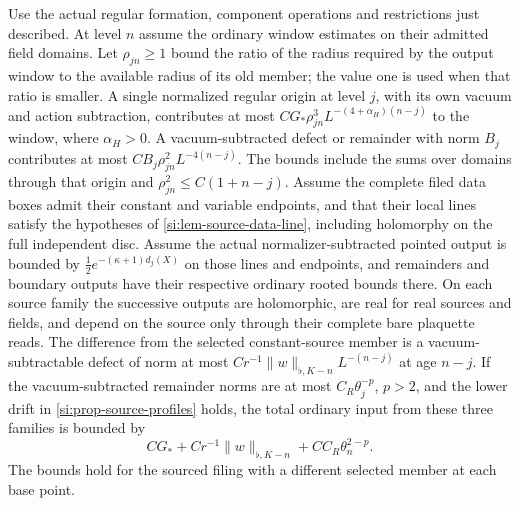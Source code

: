 \documentclass[11pt,letterpaper,reqno]{amsart}
\makeatletter
\numberwithin{equation}{section}
\theoremstyle{definition}
\newcommand{\ms@minorstart}{%
  \pushQED{\qed}\renewcommand{\qedsymbol}{$\blacksquare$}}
\newenvironment{proposition}[1][]{\ms@minorstart\ms@proposition[#1]}
  {\popQED\endms@proposition}
\theoremstyle{remark}
\makeatother
\begin{document}
\begin{samepage}
\begin{proposition}[Formation and old-origin summation]
\label{si:prop-member-formation}
Use the actual regular formation, component operations and
restrictions just described. At level $n$ assume the ordinary
window estimates on their admitted field domains. Let
$\rho_{jn}\ge1$ bound the ratio of the radius required by the
output window to the available radius of its old member;
the value one is used when that ratio is smaller. A single
normalized regular origin at level $j$, with its own vacuum and
action subtraction, contributes at most
$C G_*\rho_{jn}^3 L^{-(4+\alpha_H)(n-j)}$ to the window, where
$\alpha_H>0$. A vacuum-subtracted defect or remainder with norm
$B_j$ contributes at most $C B_j\rho_{jn}^2L^{-4(n-j)}$.
The bounds include the sums over domains through that origin and
$\rho_{jn}^2\le C(1+n-j)$. Assume the complete filed data boxes
admit their constant and variable endpoints, and that their local
lines satisfy the hypotheses of \cref{si:lem-source-data-line},
including holomorphy on the full independent disc. Assume the
actual normalizer-subtracted pointed output is bounded by
$\tfrac12 e^{-(\kappa+1)d_j(X)}$ on those lines and endpoints, and
remainders and boundary outputs have their respective ordinary
rooted bounds there. On each source family the successive outputs
are holomorphic, are real for real sources and fields, and depend
on the source only through their complete bare plaquette reads.
The difference from the selected constant-source member is a
vacuum-subtractable defect of norm at most
$C r^{-1}\|w\|_{\flat,K-n}L^{-(n-j)}$ at age $n-j$.
If the vacuum-subtracted remainder norms are at most
$C_R\theta_j^{-p}$, $p>2$, and the lower drift in
\cref{si:prop-source-profiles} holds, the total ordinary input from these
three families is bounded by
\begin{equation}\label{si:eq-member-sum}
 C G_*+ C r^{-1}\|w\|_{\flat,K-n}+C C_R\theta_n^{2-p}.
\end{equation}
The bounds hold for the sourced filing with a different selected
member at each base point.
\end{proposition}
\end{samepage}
\end{document}
